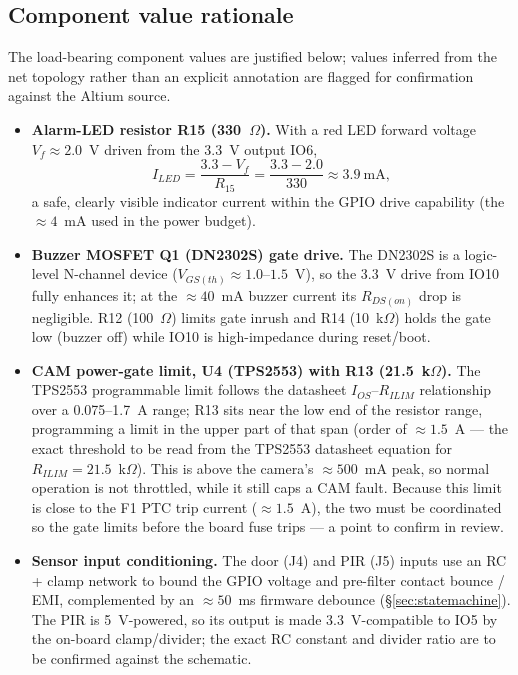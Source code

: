 \documentclass[11pt,a4paper]{article}
\begin{document}
\subsection{Component value rationale}
\label{sec:values}

The load-bearing component values are justified below; values inferred from the
net topology rather than an explicit annotation are flagged for confirmation
against the Altium source.

\begin{itemize}
    \item \textbf{Alarm-LED resistor R15 (330~$\Omega$).}  With a red LED forward
        voltage $V_f\approx2.0$~V driven from the 3.3~V output IO6,
        \[ I_{LED}=\frac{3.3-V_f}{R_{15}}=\frac{3.3-2.0}{330}\approx 3.9~\text{mA}, \]
        a safe, clearly visible indicator current within the GPIO drive
        capability (the $\approx4$~mA used in the power budget).
    \item \textbf{Buzzer MOSFET Q1 (DN2302S) gate drive.}  The DN2302S is a
        logic-level N-channel device ($V_{GS(th)}\approx1.0$--$1.5$~V), so the
        3.3~V drive from IO10 fully enhances it; at the $\approx40$~mA buzzer
        current its $R_{DS(on)}$ drop is negligible.  R12 (100~$\Omega$) limits
        gate inrush and R14 (10~k$\Omega$) holds the gate low (buzzer off) while
        IO10 is high-impedance during reset/boot.
    \item \textbf{CAM power-gate limit, U4 (TPS2553) with R13 (21.5~k$\Omega$).}
        The TPS2553 programmable limit follows the datasheet $I_{OS}$--$R_{ILIM}$
        relationship over a 0.075--1.7~A range; R13 sits near the low end of the
        resistor range, programming a limit in the upper part of that span (order
        of $\approx1.5$~A --- the exact threshold to be read from the TPS2553
        datasheet equation for $R_{ILIM}=21.5$~k$\Omega$).  This is above the
        camera's $\approx500$~mA peak, so normal operation is not throttled,
        while it still caps a CAM fault.  Because this limit is close to the F1
        PTC trip current ($\approx1.5$~A), the two must be coordinated so the gate
        limits before the board fuse trips --- a point to confirm in review.
    \item \textbf{Sensor input conditioning.}  The door (J4) and PIR (J5) inputs
        use an RC + clamp network to bound the GPIO voltage and pre-filter
        contact bounce / EMI, complemented by an $\approx50$~ms firmware debounce
        (\S\ref{sec:statemachine}).  The PIR is 5~V-powered, so its output is made
        3.3~V-compatible to IO5 by the on-board clamp/divider; the exact RC
        constant and divider ratio are to be confirmed against the schematic.
\end{itemize}
\end{document}
